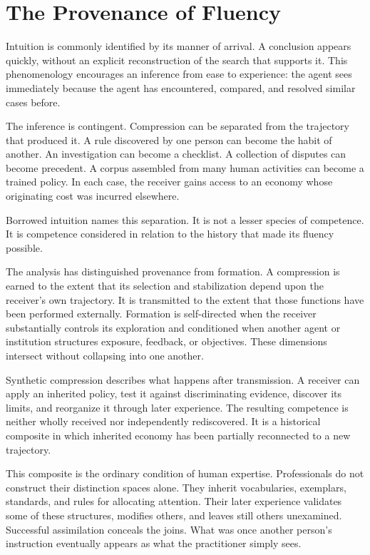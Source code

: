 \documentclass[11pt]{article}
\begin{document}
\section{The Provenance of Fluency}

Intuition is commonly identified by its manner of arrival. A conclusion appears quickly, without an explicit reconstruction of the search that supports it. This phenomenology encourages an inference from ease to experience: the agent sees immediately because the agent has encountered, compared, and resolved similar cases before.

The inference is contingent. Compression can be separated from the trajectory that produced it. A rule discovered by one person can become the habit of another. An investigation can become a checklist. A collection of disputes can become precedent. A corpus assembled from many human activities can become a trained policy. In each case, the receiver gains access to an economy whose originating cost was incurred elsewhere.

Borrowed intuition names this separation. It is not a lesser species of competence. It is competence considered in relation to the history that made its fluency possible.

The analysis has distinguished provenance from formation. A compression is earned to the extent that its selection and stabilization depend upon the receiver's own trajectory. It is transmitted to the extent that those functions have been performed externally. Formation is self-directed when the receiver substantially controls its exploration and conditioned when another agent or institution structures exposure, feedback, or objectives. These dimensions intersect without collapsing into one another.

Synthetic compression describes what happens after transmission. A receiver can apply an inherited policy, test it against discriminating evidence, discover its limits, and reorganize it through later experience. The resulting competence is neither wholly received nor independently rediscovered. It is a historical composite in which inherited economy has been partially reconnected to a new trajectory.

This composite is the ordinary condition of human expertise. Professionals do not construct their distinction spaces alone. They inherit vocabularies, exemplars, standards, and rules for allocating attention. Their later experience validates some of these structures, modifies others, and leaves still others unexamined. Successful assimilation conceals the joins. What was once another person's instruction eventually appears as what the practitioner simply sees.
\end{document}
